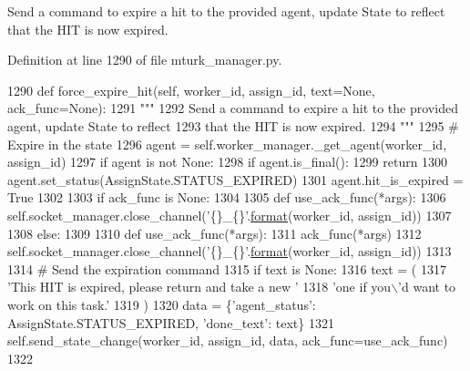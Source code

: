 \begin{DoxyVerb}Send a command to expire a hit to the provided agent, update State to reflect
that the HIT is now expired.
\end{DoxyVerb}
 

Definition at line 1290 of file mturk\+\_\+manager.\+py.


\begin{DoxyCode}
1290     \textcolor{keyword}{def }force\_expire\_hit(self, worker\_id, assign\_id, text=None, ack\_func=None):
1291         \textcolor{stringliteral}{"""}
1292 \textcolor{stringliteral}{        Send a command to expire a hit to the provided agent, update State to reflect}
1293 \textcolor{stringliteral}{        that the HIT is now expired.}
1294 \textcolor{stringliteral}{        """}
1295         \textcolor{comment}{# Expire in the state}
1296         agent = self.worker\_manager.\_get\_agent(worker\_id, assign\_id)
1297         \textcolor{keywordflow}{if} agent \textcolor{keywordflow}{is} \textcolor{keywordflow}{not} \textcolor{keywordtype}{None}:
1298             \textcolor{keywordflow}{if} agent.is\_final():
1299                 \textcolor{keywordflow}{return}
1300             agent.set\_status(AssignState.STATUS\_EXPIRED)
1301             agent.hit\_is\_expired = \textcolor{keyword}{True}
1302 
1303         \textcolor{keywordflow}{if} ack\_func \textcolor{keywordflow}{is} \textcolor{keywordtype}{None}:
1304 
1305             \textcolor{keyword}{def }use\_ack\_func(*args):
1306                 self.socket\_manager.close\_channel(\textcolor{stringliteral}{'\{\}\_\{\}'}.\hyperlink{namespaceparlai_1_1chat__service_1_1services_1_1messenger_1_1shared__utils_a32e2e2022b824fbaf80c747160b52a76}{format}(worker\_id, assign\_id))
1307 
1308         \textcolor{keywordflow}{else}:
1309 
1310             \textcolor{keyword}{def }use\_ack\_func(*args):
1311                 ack\_func(*args)
1312                 self.socket\_manager.close\_channel(\textcolor{stringliteral}{'\{\}\_\{\}'}.\hyperlink{namespaceparlai_1_1chat__service_1_1services_1_1messenger_1_1shared__utils_a32e2e2022b824fbaf80c747160b52a76}{format}(worker\_id, assign\_id))
1313 
1314         \textcolor{comment}{# Send the expiration command}
1315         \textcolor{keywordflow}{if} text \textcolor{keywordflow}{is} \textcolor{keywordtype}{None}:
1316             text = (
1317                 \textcolor{stringliteral}{'This HIT is expired, please return and take a new '}
1318                 \textcolor{stringliteral}{'one if you\(\backslash\)'d want to work on this task.'}
1319             )
1320         data = \{\textcolor{stringliteral}{'agent\_status'}: AssignState.STATUS\_EXPIRED, \textcolor{stringliteral}{'done\_text'}: text\}
1321         self.send\_state\_change(worker\_id, assign\_id, data, ack\_func=use\_ack\_func)
1322 
\end{DoxyCode}
